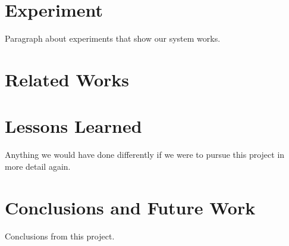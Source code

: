 \documentclass{acm_proc}
\begin{document}
\section{Experiment}\label{sec:experiment}

Paragraph about experiments that show our system works.

\section{Related Works}\label{sec:related}

\section{Lessons Learned}\label{sec:lessons}

Anything we would have done differently if we were to pursue this project
in more detail again.

\section{Conclusions and Future Work}\label{sec:conclusions}

Conclusions from this project.



\end{document}
